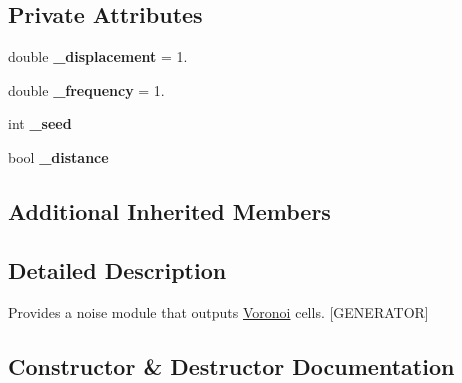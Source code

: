 \subsection*{Private Attributes}
\begin{DoxyCompactItemize}
\item 
\mbox{\label{class_lib_noise_1_1_generator_1_1_voronoi_a495800a4414c659e997b6dcd4771e0af}} 
double {\bfseries \+\_\+displacement} = 1.
\item 
\mbox{\label{class_lib_noise_1_1_generator_1_1_voronoi_a4cb3cf30ddf559411a30701d8c8de951}} 
double {\bfseries \+\_\+frequency} = 1.
\item 
\mbox{\label{class_lib_noise_1_1_generator_1_1_voronoi_a1d26248be74669fb49b870047f7ec350}} 
int {\bfseries \+\_\+seed}
\item 
\mbox{\label{class_lib_noise_1_1_generator_1_1_voronoi_a45022a1500c456556d60eafa483bda5d}} 
bool {\bfseries \+\_\+distance}
\end{DoxyCompactItemize}
\subsection*{Additional Inherited Members}


\subsection{Detailed Description}
Provides a noise module that outputs \hyperlink{class_lib_noise_1_1_generator_1_1_voronoi}{Voronoi} cells. \mbox{[}G\+E\+N\+E\+R\+A\+T\+OR\mbox{]} 



\subsection{Constructor \& Destructor Documentation}
\mbox{\label{class_lib_noise_1_1_generator_1_1_voronoi_a71b16e9683fa35aaa260e495848ec73d}} 
